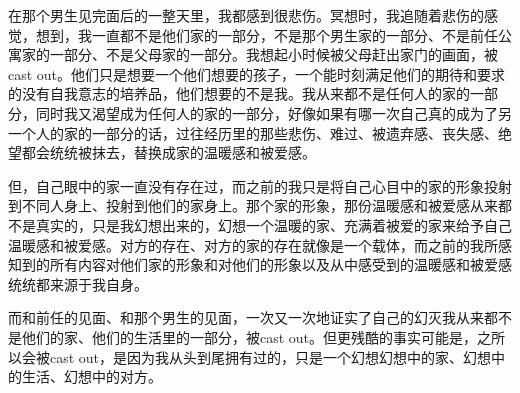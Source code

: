 在那个男生见完面后的一整天里，我都感到很悲伤。冥想时，我追随着悲伤的感觉，想到，我一直都不是他们家的一部分，不是那个男生家的一部分、不是前任公寓家的一部分、不是父母家的一部分。我想起小时候被父母赶出家门的画面，被cast out。他们只是想要一个他们想要的孩子，一个能时刻满足他们的期待和要求的没有自我意志的培养品，他们想要的不是我。我从来都不是任何人的家的一部分，同时我又渴望成为任何人的家的一部分，好像如果有哪一次自己真的成为了另一个人的家的一部分的话，过往经历里的那些悲伤、难过、被遗弃感、丧失感、绝望都会统统被抹去，替换成家的温暖感和被爱感。

但，自己眼中的家一直没有存在过，而之前的我只是将自己心目中的家的形象投射到不同人身上、投射到他们的家身上。那个家的形象，那份温暖感和被爱感从来都不是真实的，只是我幻想出来的，幻想一个温暖的家、充满着被爱的家来给予自己温暖感和被爱感。对方的存在、对方的家的存在就像是一个载体，而之前的我所感知到的所有内容\pozhehao{}对他们家的形象和对他们的形象以及从中感受到的温暖感和被爱感统统都来源于我自身。

而和前任的见面、和那个男生的见面，一次又一次地证实了自己的幻灭\pozhehao{}我从来都不是他们的家、他们的生活里的一部分，被cast out。但更残酷的事实可能是，之所以会被cast out，是因为我从头到尾拥有过的，只是一个幻想\pozhehao{}幻想中的家、幻想中的生活、幻想中的对方。

